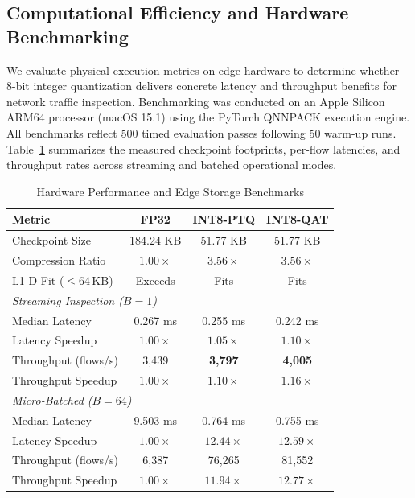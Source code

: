 \documentclass[conference]{IEEEtran}
\begin{document}
\subsection{Computational Efficiency and Hardware Benchmarking}

We evaluate physical execution metrics on edge hardware to determine whether 8-bit integer quantization delivers concrete latency and throughput benefits for network traffic inspection. Benchmarking was conducted on an Apple Silicon ARM64 processor (macOS 15.1) using the PyTorch QNNPACK execution engine. All benchmarks reflect 500 timed evaluation passes following 50 warm-up runs. Table~\ref{tab:hardware} summarizes the measured checkpoint footprints, per-flow latencies, and throughput rates across streaming and batched operational modes.

\begin{table}[htbp]
\caption{Hardware Performance and Edge Storage Benchmarks}
\label{tab:hardware}
\centering
\footnotesize
\setlength{\tabcolsep}{3pt}
\begin{tabular}{lccc}
\toprule
\textbf{Metric} & \textbf{FP32} & \textbf{INT8-PTQ} & \textbf{INT8-QAT} \\
\midrule
Checkpoint Size & 184.24 KB & 51.77 KB & 51.77 KB \\
Compression Ratio & $1.00\times$ & $\mathbf{3.56\times}$ & $\mathbf{3.56\times}$ \\
L1-D Fit ($\le 64\,$KB) & Exceeds & Fits & Fits \\
\midrule
\multicolumn{4}{l}{\textit{Streaming Inspection ($B = 1$)}} \\
Median Latency & 0.267 ms & 0.255 ms & 0.242 ms \\
Latency Speedup & $1.00\times$ & $1.05\times$ & $1.10\times$ \\
Throughput (flows/s) & 3,439 & \textbf{3,797} & \textbf{4,005} \\
Throughput Speedup & $1.00\times$ & $\mathbf{1.10\times}$ & $\mathbf{1.16\times}$ \\
\midrule
\multicolumn{4}{l}{\textit{Micro-Batched ($B = 64$)}} \\
Median Latency & 9.503 ms & 0.764 ms & 0.755 ms \\
Latency Speedup & $1.00\times$ & $\mathbf{12.44\times}$ & $\mathbf{12.59\times}$ \\
Throughput (flows/s) & 6,387 & 76,265 & 81,552 \\
Throughput Speedup & $1.00\times$ & $\mathbf{11.94\times}$ & $\mathbf{12.77\times}$ \\
\bottomrule
\end{tabular}
\end{table}
\end{document}
